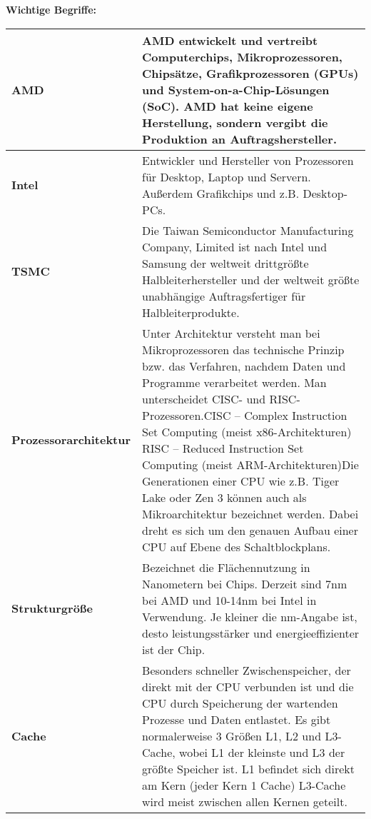 \documentclass[asp1.tex]{subfiles}
\begin{document}
\textbf{Wichtige Begriffe:}
\begin{longtable}{|p{}|p{}|}
    \hline

    \textbf{AMD}                           & AMD entwickelt und vertreibt Computerchips, Mikroprozessoren, Chipsätze, Grafikprozessoren (GPUs) und System-on-a-Chip-Lösungen (SoC).
    \newline AMD hat keine eigene Herstellung, sondern vergibt die Produktion an Auftragshersteller.

    \\\hline

    \textbf{Intel}                         & Entwickler und Hersteller von Prozessoren für Desktop, Laptop und Servern. Außerdem Grafikchips und z.B. Desktop-PCs.

    \\\hline

    \textbf{TSMC}                          & Die Taiwan Semiconductor Manufacturing Company, Limited ist nach Intel und Samsung der weltweit drittgrößte Halbleiterhersteller und der weltweit größte unabhängige Auftragsfertiger für Halbleiterprodukte.

    \\\hline

    \textbf{Prozessorarchitektur}          & Unter Architektur versteht man bei Mikroprozessoren das technische Prinzip bzw. das Verfahren, nachdem Daten und Programme verarbeitet werden. Man unterscheidet CISC- und RISC-Prozessoren.CISC – Complex Instruction Set Computing (meist x86-Architekturen) RISC – Reduced Instruction Set Computing (meist ARM-Architekturen)Die Generationen einer CPU wie z.B. Tiger Lake oder Zen 3 können auch als Mikroarchitektur bezeichnet werden. Dabei dreht es sich um den genauen Aufbau einer CPU auf Ebene des Schaltblockplans.

    \\\hline

    \textbf{Strukturgröße}                 & Bezeichnet die Flächennutzung in Nanometern bei Chips. Derzeit sind 7nm bei AMD und 10-14nm bei Intel in Verwendung. Je kleiner die nm-Angabe ist, desto leistungsstärker und energieeffizienter ist der Chip.

    \\\hline

    \textbf{Cache}                         & Besonders schneller Zwischenspeicher, der direkt mit der CPU verbunden ist und die CPU durch Speicherung der wartenden Prozesse und Daten entlastet. Es gibt normalerweise 3 Größen L1, L2 und L3-Cache, wobei L1 der kleinste und L3 der größte Speicher ist. L1 befindet sich direkt am Kern (jeder Kern 1 Cache) L3-Cache wird meist zwischen allen Kernen geteilt.


\end{longtable}
\end{document}
